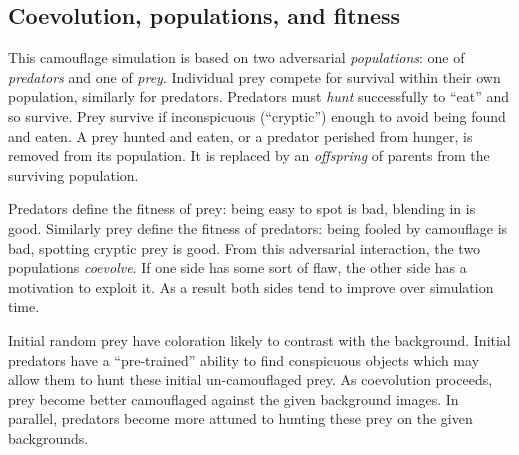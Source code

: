 \documentclass[acmtog]{acmart}
\newcommand{\jargon}[1]{\textit{#1}}
\begin{document}
\subsection{Coevolution, populations, and fitness}
This camouflage simulation is based on two adversarial \jargon{populations}: one of \jargon{predators} and one of \jargon{prey}. Individual prey compete for survival within their own population, similarly for predators. Predators must \jargon{hunt} successfully to “eat” and so survive. Prey survive if inconspicuous (“cryptic”) enough to avoid being found and eaten. A prey hunted and eaten, or a predator perished from hunger, is removed from its population. It is replaced by an \jargon{offspring} of parents from the surviving population.
\par
Predators define the fitness of prey: being easy to spot is bad, blending in is good. Similarly prey define the fitness of predators: being fooled by camouflage is bad, spotting cryptic prey is good. From this adversarial interaction, the two populations \jargon{coevolve}. If one side has some sort of flaw, the other side has a motivation to exploit it. As a result both sides tend to improve over simulation time.
\par
Initial random prey have coloration likely to contrast with the background. Initial predators have a “pre-trained” ability to find conspicuous objects which may allow them to hunt these initial un-camouflaged prey. As coevolution proceeds, prey become better camouflaged against the given background images. In parallel, predators become more attuned to hunting these prey on the given backgrounds.
\par

\end{document}
